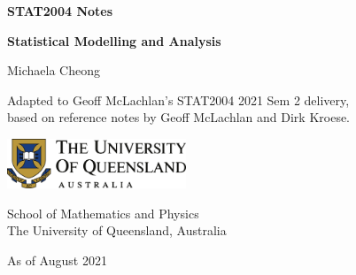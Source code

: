 \begin{titlepage}
    \begin{center}
        \vspace*{3cm}
            
        \Huge
        \textbf{STAT2004 Notes}
            
        \vspace{0.5cm}
        \LARGE
        \textbf{Statistical Modelling and Analysis}
            
        \vspace{1.5cm}
            
        Michaela Cheong
            
        \vfill

        \large
        Adapted to Geoff McLachlan's STAT2004 2021 Sem 2 delivery, \\
        based on reference notes by Geoff McLachlan and Dirk Kroese.
            
        \vspace{0.8cm}
            
        \includegraphics[width=0.4\textwidth]{uq}
        
        \vspace{0.5cm}

        School of Mathematics and Physics\\
        The University of Queensland, Australia\\

        \vspace{0.8cm}

        As of August 2021
            
    \end{center}
\end{titlepage}

\tableofcontents